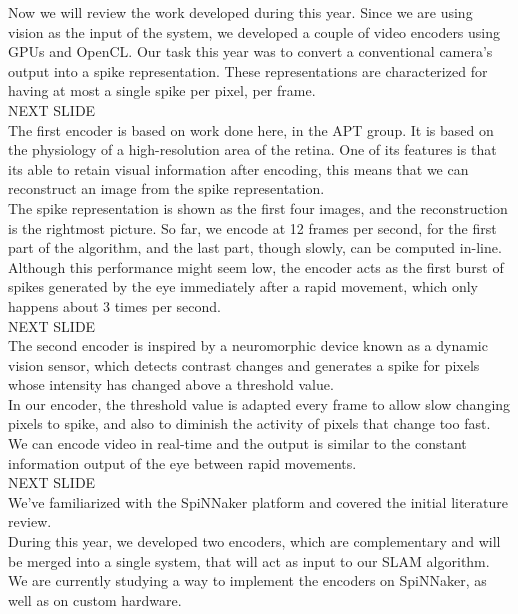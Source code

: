 \documentclass[12t,a4paper]{memoir}
\begin{document}
Now we will review the work developed during this year. Since we are using vision as the input of the system, we developed a couple of video encoders using GPUs and OpenCL. Our task this year was to convert a conventional camera's output into a spike representation. These representations are characterized for having at most a single spike per pixel, per frame.\\

{\Large NEXT SLIDE}\\

The first encoder is based on work done here, in the APT group. It is based on the physiology of a high-resolution area of the retina. One of its features is that its able to retain visual information after encoding, this means that we can reconstruct an image from the spike representation.\\

The spike representation is shown as the first four images, and the reconstruction is the rightmost picture. So far, we encode at 12 frames per second, for the first part of the algorithm, and the last part, though slowly, can be computed in-line. Although this performance might seem low, the encoder acts as the first burst of spikes generated by the eye immediately after a rapid movement, which only happens about 3 times per second.\\

{\Large NEXT SLIDE}\\

The second encoder is inspired by a neuromorphic device known as a dynamic vision sensor, which detects contrast changes and generates a spike for pixels whose intensity has changed above a threshold value.\\

In our encoder, the threshold value is adapted every frame to allow slow changing pixels to spike, and also to diminish the activity of pixels that change too fast. We can encode video in real-time and the output is similar to the constant information output of the eye between rapid movements.\\

{\Large NEXT SLIDE}\\

We've familiarized with the SpiNNaker platform and covered the initial literature review. \\

During this year, we developed two encoders, which are complementary and will be merged into a single system, that will act as input to our SLAM algorithm. We are currently studying a way to implement the encoders on SpiNNaker, as well as on custom hardware.\\
\end{document}
